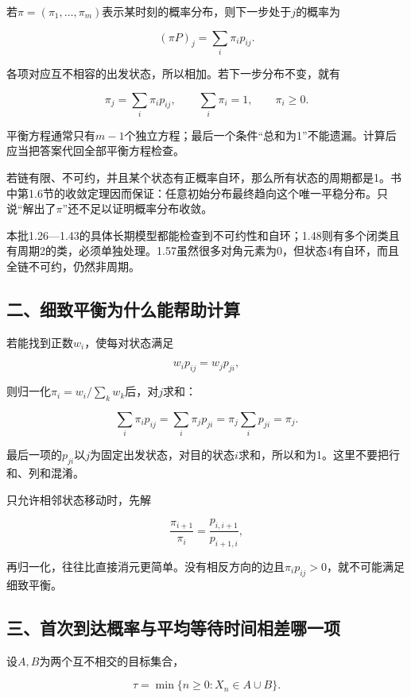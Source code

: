 \documentclass[
  11pt,
  a4paper,
  UTF8,
  fontset=fandol]{ctexart}
\begin{document}
若\(\pi=(\pi_1,\ldots,\pi_m)\)表示某时刻的概率分布，则下一步处于\(j\)的概率为

\[
(\pi P)_j=\sum_i\pi_i p_{ij}.
\]

各项对应互不相容的出发状态，所以相加。若下一步分布不变，就有

\[
\pi_j=\sum_i\pi_i p_{ij},\qquad \sum_i\pi_i=1,\qquad \pi_i\ge0.
\]

平衡方程通常只有\(m-1\)个独立方程；最后一个条件``总和为1''不能遗漏。计算后应当把答案代回全部平衡方程检查。

若链有限、不可约，并且某个状态有正概率自环，那么所有状态的周期都是1。书中第1.6节的收敛定理因而保证：任意初始分布最终趋向这个唯一平稳分布。只说``解出了\(\pi\)''还不足以证明概率分布收敛。

本批1.26---1.43的具体长期模型都能检查到不可约性和自环；1.48则有多个闭类且有周期2的类，必须单独处理。1.57虽然很多对角元素为0，但状态4有自环，而且全链不可约，仍然非周期。

\subsection{二、细致平衡为什么能帮助计算}\label{ux4e8cux7ec6ux81f4ux5e73ux8861ux4e3aux4ec0ux4e48ux80fdux5e2eux52a9ux8ba1ux7b97}

若能找到正数\(w_i\)，使每对状态满足

\[
w_i p_{ij}=w_jp_{ji},
\]

则归一化\(\pi_i=w_i/\sum_kw_k\)后，对\(j\)求和：

\[
\sum_i\pi_i p_{ij}=\sum_i\pi_jp_{ji}=\pi_j\sum_i p_{ji}=\pi_j.
\]

最后一项的\(p_{ji}\)以\(j\)为固定出发状态，对目的状态\(i\)求和，所以和为1。这里不要把行和、列和混淆。

只允许相邻状态移动时，先解

\[
\frac{\pi_{i+1}}{\pi_i}=\frac{p_{i,i+1}}{p_{i+1,i}},
\]

再归一化，往往比直接消元更简单。没有相反方向的边且\(\pi_i p_{ij}>0\)，就不可能满足细致平衡。

\subsection{三、首次到达概率与平均等待时间相差哪一项}\label{ux4e09ux9996ux6b21ux5230ux8fbeux6982ux7387ux4e0eux5e73ux5747ux7b49ux5f85ux65f6ux95f4ux76f8ux5deeux54eaux4e00ux9879}

设\(A,B\)为两个互不相交的目标集合，

\[
\tau=\min\{n\ge0:X_n\in A\cup B\}.
\]
\end{document}
